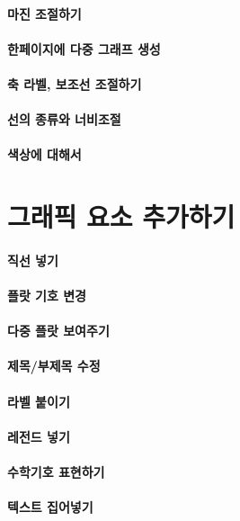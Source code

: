 \documentclass{report}
\begin{document}
\paragraph{마진 조절하기}
\paragraph{한페이지에 다중 그래프 생성}
\paragraph{축 라벨, 보조선 조절하기}
\paragraph{선의 종류와 너비조절}
\paragraph{색상에 대해서}


\section{그래픽 요소 추가하기}
\paragraph{직선 넣기}
\paragraph{플랏 기호 변경}
\paragraph{다중 플랏 보여주기}
\paragraph{제목/부제목 수정}
\paragraph{라벨 붙이기}
\paragraph{레전드 넣기}
\paragraph{수학기호 표현하기}
\paragraph{텍스트 집어넣기}
\end{document}
